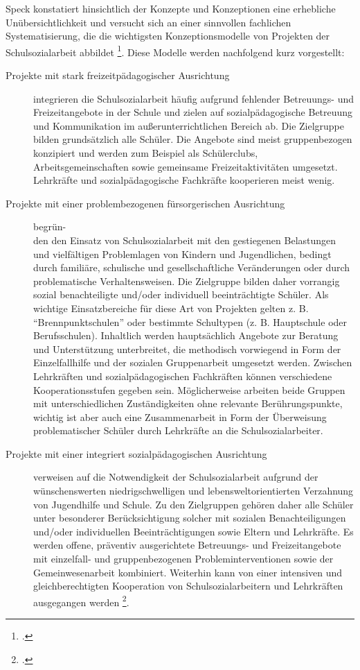 Speck konstatiert hinsichtlich der Konzepte und Konzeptionen eine erhebliche Unübersichtlichkeit und versucht sich an einer sinnvollen fachlichen Systematisierung, die die wichtigsten Konzeptionsmodelle von Projekten der Schulsozialarbeit abbildet \footcite[vgl.][25f]{Speck2006}. Diese Modelle werden nachfolgend kurz vorgestellt:
\begin{description}
	\item[Projekte mit stark freizeitpädagogischer Ausrichtung] integrieren die Schulsozialarbeit häufig aufgrund fehlender Betreuungs- und Freizeitangebote in der Schule und zielen auf sozialpädagogische Betreuung und Kommunikation im außerunterrichtlichen Bereich ab. Die Zielgruppe bilden grundsätzlich alle Schüler. Die Angebote sind meist gruppenbezogen konzipiert und werden zum Beispiel als Schülerclubs, Arbeitsgemeinschaften sowie gemeinsame Freizeitaktivitäten umgesetzt. Lehrkräfte und sozialpädagogische Fachkräfte kooperieren meist wenig. 
	\item[Projekte mit einer problembezogenen fürsorgerischen Ausrichtung] begrün-\\ 
den den Einsatz von Schulsozialarbeit mit den gestiegenen Belastungen und vielfältigen Problemlagen von Kindern und Jugendlichen, bedingt durch familiäre, schulische und gesellschaftliche Veränderungen oder durch problematische Verhaltensweisen. Die Zielgruppe bilden daher vorrangig sozial benachteiligte und/oder individuell beeinträchtigte Schüler. Als wichtige Einsatzbereiche für diese Art von Projekten gelten z. B. "`Brennpunktschulen"' oder bestimmte Schultypen (z. B. Hauptschule oder Berufsschulen). Inhaltlich werden hauptsächlich Angebote zur Beratung und Unterstützung unterbreitet, die methodisch vorwiegend in Form der Einzelfallhilfe und der sozialen Gruppenarbeit umgesetzt werden. Zwischen Lehrkräften und sozialpädagogischen Fachkräften können verschiedene Kooperationsstufen gegeben sein. Möglicherweise arbeiten beide Gruppen mit unterschiedlichen Zuständigkeiten ohne relevante Berührungspunkte, wichtig ist aber auch eine Zusammenarbeit in Form der Überweisung problematischer Schüler durch Lehrkräfte an die Schulsozialarbeiter.
	\item[Projekte mit einer integriert sozialpädagogischen Ausrichtung] verweisen auf die Notwendigkeit der Schulsozialarbeit aufgrund der wünschenswerten niedrigschwelligen und lebensweltorientierten Verzahnung von Jugendhilfe und Schule. Zu den Zielgruppen gehören daher alle Schüler unter besonderer Berücksichtigung solcher mit sozialen Benachteiligungen und/oder individuellen Beeinträchtigungen sowie Eltern und Lehrkräfte. Es werden offene, präventiv ausgerichtete Betreuungs- und Freizeitangebote mit einzelfall- und gruppenbezogenen Probleminterventionen sowie der Gemeinwesenarbeit kombiniert. Weiterhin kann von einer intensiven und gleichberechtigten Kooperation von Schulsozialarbeitern und Lehrkräften ausgegangen werden \footcite[vgl.][25f]{Speck2006}.
\end{description}

